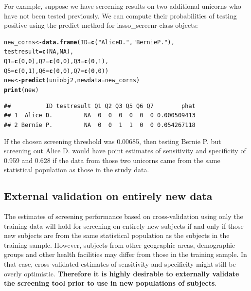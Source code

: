 \documentclass[11pt]{report}\usepackage[]{graphicx}\usepackage[]{xcolor}
\makeatletter
\newcommand{\hlnum}[1]{\textcolor[rgb]{0.686,0.059,0.569}{#1}}%
\newcommand{\hlstr}[1]{\textcolor[rgb]{0.192,0.494,0.8}{#1}}%
\newcommand{\hlstd}[1]{\textcolor[rgb]{0.345,0.345,0.345}{#1}}%
\newcommand{\hlkwb}[1]{\textcolor[rgb]{0.69,0.353,0.396}{#1}}%
\newcommand{\hlkwc}[1]{\textcolor[rgb]{0.333,0.667,0.333}{#1}}%
\newcommand{\hlkwd}[1]{\textcolor[rgb]{0.737,0.353,0.396}{\textbf{#1}}}%
\newenvironment{kframe}{%
 \def\at@end@of@kframe{}%
 \ifinner\ifhmode%
  \def\at@end@of@kframe{\end{minipage}}%
  \begin{minipage}{\columnwidth}%
 \fi\fi%
 \def\FrameCommand##1{\hskip\@totalleftmargin \hskip-\fboxsep
 \colorbox{shadecolor}{##1}\hskip-\fboxsep
     \hskip-\linewidth \hskip-\@totalleftmargin \hskip\columnwidth}%
 \MakeFramed {\advance\hsize-\width
   \@totalleftmargin\z@ \linewidth\hsize
   \@setminipage}}%
 {\par\unskip\endMakeFramed%
 \at@end@of@kframe}
\newenvironment{knitrout}{}{} %
\makeatother
\begin{document}
For example, suppose we have screening results on two additional
unicorns who have not been tested previously. We can compute their
probabilities of testing positive using the \textsf{predict} method for
\textsf{lasso\_screenr}-class objects:
\begin{knitrout}
\color{fgcolor}\begin{kframe}
\begin{alltt}
\hlstd{new_corns} \hlkwb{<-} \hlkwd{data.frame}\hlstd{(}\hlkwc{ID} \hlstd{=} \hlkwd{c}\hlstd{(}\hlstr{"Alice D."}\hlstd{,} \hlstr{"Bernie P."}\hlstd{),}
                        \hlkwc{testresult} \hlstd{=} \hlkwd{c}\hlstd{(}\hlnum{NA}\hlstd{,} \hlnum{NA}\hlstd{),}
                        \hlkwc{Q1} \hlstd{=} \hlkwd{c}\hlstd{(}\hlnum{0}\hlstd{,} \hlnum{0}\hlstd{),} \hlkwc{Q2} \hlstd{=} \hlkwd{c}\hlstd{(}\hlnum{0}\hlstd{,} \hlnum{0}\hlstd{),} \hlkwc{Q3} \hlstd{=} \hlkwd{c}\hlstd{(}\hlnum{0}\hlstd{,} \hlnum{1}\hlstd{),}
                        \hlkwc{Q5} \hlstd{=} \hlkwd{c}\hlstd{(}\hlnum{0}\hlstd{,} \hlnum{1}\hlstd{),} \hlkwc{Q6} \hlstd{=} \hlkwd{c}\hlstd{(}\hlnum{0}\hlstd{,} \hlnum{0}\hlstd{),} \hlkwc{Q7} \hlstd{=} \hlkwd{c}\hlstd{(}\hlnum{0}\hlstd{,} \hlnum{0}\hlstd{))}
\hlstd{new} \hlkwb{<-} \hlkwd{predict}\hlstd{(uniobj2,}  \hlkwc{newdata} \hlstd{= new_corns )}
\hlkwd{print}\hlstd{(new)}
\end{alltt}
\begin{verbatim}
##          ID testresult Q1 Q2 Q3 Q5 Q6 Q7        phat
## 1  Alice D.         NA  0  0  0  0  0  0 0.000509413
## 2 Bernie P.         NA  0  0  1  1  0  0 0.054267118
\end{verbatim}
\end{kframe}
\end{knitrout}

If the chosen screening threshold was 0.00685, then testing Bernie P.
but screening out Alice D. would have point estimates of sensitivity
and specificity of 0.959 and 0.628 if the data from those two unicorns
came from the same statistical population as those in the study data.

\subsection*{External validation on entirely new data}

The estimates of screening performance based on cross-validation using
only the training data will hold for screening on entirely new
subjects if and only if those new subjects are from the same
statistical population as the subjects in the training
sample. However, subjects from other geographic areas, demographic
groups and other health facilities may differ from those in the
training sample. In that case, cross-validated estimates of
sensitivity and specificity might still be overly optimistic.
\textbf{Therefore it is highly desirable to externally validate the
screening tool prior to use in new populations of subjects}.
\end{document}
